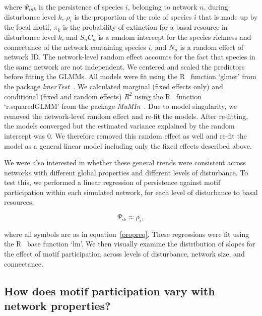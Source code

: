 \documentclass[12pt]{article}
\begin{document}
\begin{spacing}{2.0}
        \noindent where $\Psi_{ink}$ is the persistence of species $i$, belonging to network $n$, during disturbance level $k$, $\rho_{i}$ is the proportion of the role of species $i$ that is made up by the focal motif, $\pi_{k}$ is the probability of extinction for a basal resource in disturbance level $k$, and $S_{n}C_{n}$ is a random intercept for the species richness and connectance of the network containing species $i$, and $N_n$ is a random effect of network ID.
        The network-level random effect accounts for the fact that species in the same network are not independent.
        We centered and scaled the predictors before fitting the GLMMs.
        All models were fit using the R~\citep{R} function `glmer' from the package \emph{lmerTest}~\citep{lmerTest}.
        We calculated marginal (fixed effects only) and conditional (fixed and random effects) $R^2$ using the R~\citep{R} function `r.squaredGLMM' from the package \emph{MuMIn}~\citep{MuMIn}.
        Due to model singularity, we removed the network-level random effect and re-fit the models.
        After re-fitting, the models converged but the estimated variance explained by the random intercept was 0.
        We therefore removed this random effect as well and re-fit the model as a general linear model including only the fixed effects described above.

        
        We were also interested in whether these general trends were consistent across networks with different global properties and different levels of disturbance. 
        To test this, we performed a linear regression of persistence against motif participation within each simulated network, for each level of disturbance to basal resources:

        \begin{equation}
            \Psi_{ik} \approx \rho_{i} ,
            \label{mineq}
        \end{equation}

        \noindent where all symbols are as in equation~\ref{propreq}.
        These regressions were fit using the R~\citep{R} base function `lm'.
        We then visually examine the distribution of slopes for the effect of motif participation across levels of disturbance, network size, and connectance. 


    \subsection{How does motif participation vary with network properties?}


\end{spacing}
\end{document}
